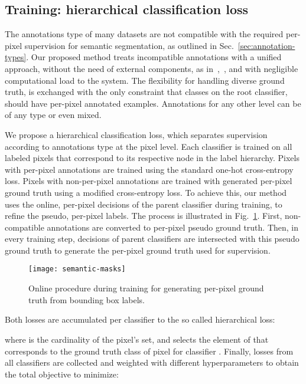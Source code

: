 \documentclass[letterpaper, 10 pt, conference]{ieeeconf}
\begin{document}
\subsection{Training: hierarchical classification loss}
\label{subsec:training}
The annotations type of many datasets are not compatible with the required per-pixel supervision for semantic segmentation, as outlined in Sec.~\ref{sec:annotation-types}. Our proposed method treats incompatible annotations with a unified approach, without the need of external components, as in~\cite{ye2018diverse},~\cite{papandreou2015weakly}, and with negligible computational load to the system. The flexibility for handling diverse ground truth, is exchanged with the only constraint that classes on the root classifier, should have per-pixel annotated examples. Annotations for any other level can be of any type or even mixed.

We propose a hierarchical classification loss, which separates supervision according to annotations type at the pixel level. Each classifier  is trained on all labeled pixels  that correspond to its respective node in the label hierarchy. Pixels  with per-pixel annotations are trained using the standard one-hot cross-entropy loss. Pixels  with non-per-pixel annotations are trained with generated per-pixel ground truth using a modified cross-entropy loss. 
To achieve this, our method uses the online, per-pixel decisions of the parent classifier during training, to refine the pseudo, per-pixel labels.
The process is illustrated in Fig.~\ref{fig:semantic-masks}. First, non-compatible annotations are converted to per-pixel pseudo ground truth.
Then, in every training step, decisions of parent classifiers are intersected with this pseudo ground truth to generate the per-pixel ground truth used for supervision.

\begin{figure}
	\begin{center}
		\texttt{[image: semantic-masks]}
	\end{center}
	\caption{Online procedure during training for generating per-pixel ground truth from bounding box labels.}
	\label{fig:semantic-masks}
\end{figure}

Both losses are accumulated per classifier to the so called hierarchical loss:

where  is the cardinality of the pixel's set, and  selects the element of  that corresponds to the ground truth class of pixel  for classifier . Finally, losses from all classifiers are collected and weighted with different hyperparameters  to obtain the total objective to minimize:
\end{document}
